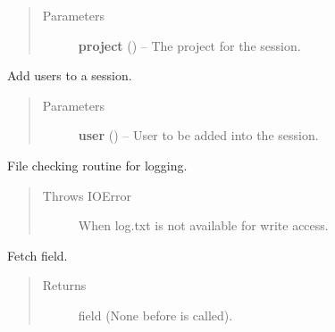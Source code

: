 \documentclass[letterpaper,10pt,english]{sphinxmanual}
\begin{document}
\begin{fulllineitems}
\begin{description}
\begin{itemize}
\end{itemize}

\end{description}
\begin{quote}\begin{description}
\item[{Parameters}] \leavevmode
\textbf{project} ({\hyperref[models:models.Project]{}}) -- The project for the session.

\end{description}\end{quote}

\begin{fulllineitems}
\label{models:models.Session.addUser}
Add users to a session.
\begin{quote}\begin{description}
\item[{Parameters}] \leavevmode
\textbf{user} ({\hyperref[models:models.User]{}}) -- User to be added into the session.

\end{description}\end{quote}

\end{fulllineitems}


\begin{fulllineitems}
\label{models:models.Session.fileRoutine}
File checking routine for logging.
\begin{quote}\begin{description}
\item[{Throws IOError}] \leavevmode
When log.txt is not available for write access.

\end{description}\end{quote}

\end{fulllineitems}


\begin{fulllineitems}
\label{models:models.Session.get_last_checked}
Fetch  field.
\begin{quote}\begin{description}
\item[{Returns}] \leavevmode
{} field (None before
{\hyperref[models:models.Session.start]{}} is called).


\end{description}
\end{quote}
\end{fulllineitems}
\end{fulllineitems}
\end{document}
